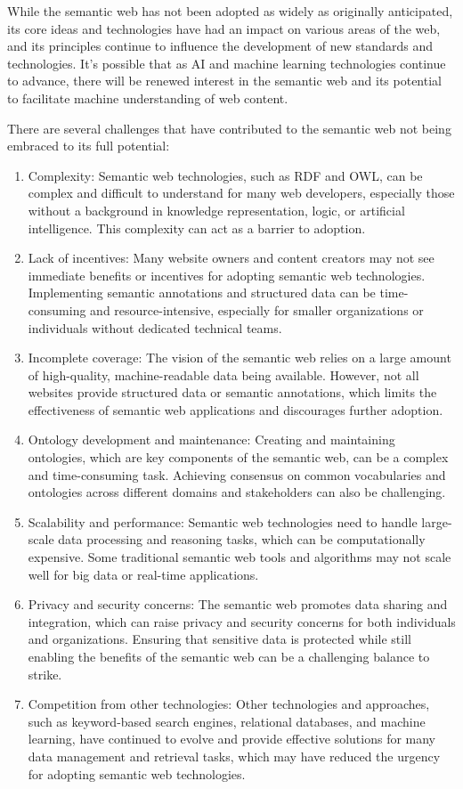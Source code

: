 \begin{mdframed}
While the semantic web has not been adopted as widely as originally anticipated, its core ideas and technologies have had an impact on various areas of the web, and its principles continue to influence the development of new standards and technologies. It's possible that as AI and machine learning technologies continue to advance, there will be renewed interest in the semantic web and its potential to facilitate machine understanding of web content.

There are several challenges that have contributed to the semantic web not being embraced to its full potential:

\begin{enumerate}
  \item Complexity: Semantic web technologies, such as RDF and OWL, can be complex and difficult to understand for many web developers, especially those without a background in knowledge representation, logic, or artificial intelligence. This complexity can act as a barrier to adoption.
  \item Lack of incentives: Many website owners and content creators may not see immediate benefits or incentives for adopting semantic web technologies. Implementing semantic annotations and structured data can be time-consuming and resource-intensive, especially for smaller organizations or individuals without dedicated technical teams.
  \item Incomplete coverage: The vision of the semantic web relies on a large amount of high-quality, machine-readable data being available. However, not all websites provide structured data or semantic annotations, which limits the effectiveness of semantic web applications and discourages further adoption.
  \item Ontology development and maintenance: Creating and maintaining ontologies, which are key components of the semantic web, can be a complex and time-consuming task. Achieving consensus on common vocabularies and ontologies across different domains and stakeholders can also be challenging.
  \item Scalability and performance: Semantic web technologies need to handle large-scale data processing and reasoning tasks, which can be computationally expensive. Some traditional semantic web tools and algorithms may not scale well for big data or real-time applications.
  \item Privacy and security concerns: The semantic web promotes data sharing and integration, which can raise privacy and security concerns for both individuals and organizations. Ensuring that sensitive data is protected while still enabling the benefits of the semantic web can be a challenging balance to strike.
  \item Competition from other technologies: Other technologies and approaches, such as keyword-based search engines, relational databases, and machine learning, have continued to evolve and provide effective solutions for many data management and retrieval tasks, which may have reduced the urgency for adopting semantic web technologies.
\end{enumerate}


\end{mdframed}
